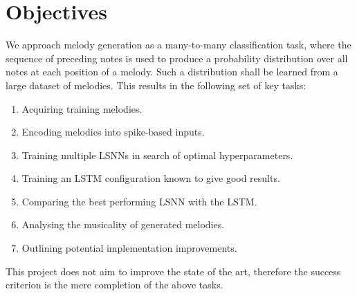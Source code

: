 \documentclass[../../report.tex]{subfiles}
\begin{document}
\section{Objectives}

We approach melody generation as a many-to-many classification task, where the
sequence of preceding notes is used to produce a probability distribution over
all notes at each position of a melody. Such a distribution shall be learned
from a large dataset of melodies. This results in the following set of key
tasks:

\begin{enumerate}
  \item Acquiring training melodies.
  \item Encoding melodies into spike-based inputs.
  \item Training multiple LSNNs in search of optimal hyperparameters.
  \item Training an LSTM configuration known to give good results.
  \item Comparing the best performing LSNN with the LSTM.
  \item Analysing the musicality of generated melodies.
  \item Outlining potential implementation improvements.
\end{enumerate}

This project does not aim to improve the state of the art, therefore the success
criterion is the mere completion of the above tasks.
\end{document}
